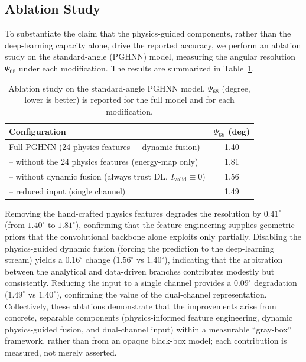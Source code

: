 \documentclass[preprint,12pt]{elsarticle}
\begin{document}
\subsection{Ablation Study}
\label{ssec:ablation}

To substantiate the claim that the physics-guided components, rather than the deep-learning capacity alone, drive the reported accuracy, we perform an ablation study on the standard-angle (PGHNN) model, measuring the angular resolution $\Psi_{68}$ under each modification. The results are summarized in Table~\ref{tab:ablation}.

\begin{table}[htbp]
\centering
\caption{Ablation study on the standard-angle PGHNN model. $\Psi_{68}$ (degree, lower is better) is reported for the full model and for each modification.}
\label{tab:ablation}
\begin{tabular*}{\textwidth}{@{\extracolsep{\fill}}lc}
\hline
\textbf{Configuration} & \textbf{$\Psi_{68}$ (deg)} \\ \hline
Full PGHNN (24 physics features + dynamic fusion) & 1.40 \\
-- without the 24 physics features (energy-map only) & 1.81 \\
-- without dynamic fusion (always trust DL, $I_{\text{valid}}\equiv 0$) & 1.56 \\
-- reduced input (single channel) & 1.49 \\ \hline
\end{tabular*}
\end{table}

Removing the hand-crafted physics features degrades the resolution by $0.41^{\circ}$ (from $1.40^{\circ}$ to $1.81^{\circ}$), confirming that the feature engineering supplies geometric priors that the convolutional backbone alone exploits only partially. Disabling the physics-guided dynamic fusion (forcing the prediction to the deep-learning stream) yields a $0.16^{\circ}$ change ($1.56^{\circ}$ vs $1.40^{\circ}$), indicating that the arbitration between the analytical and data-driven branches contributes modestly but consistently. Reducing the input to a single channel provides a $0.09^{\circ}$ degradation ($1.49^{\circ}$ vs $1.40^{\circ}$), confirming the value of the dual-channel representation. Collectively, these ablations demonstrate that the improvements arise from concrete, separable components (physics-informed feature engineering, dynamic physics-guided fusion, and dual-channel input) within a measurable ``gray-box'' framework, rather than from an opaque black-box model; each contribution is measured, not merely asserted.
\end{document}

